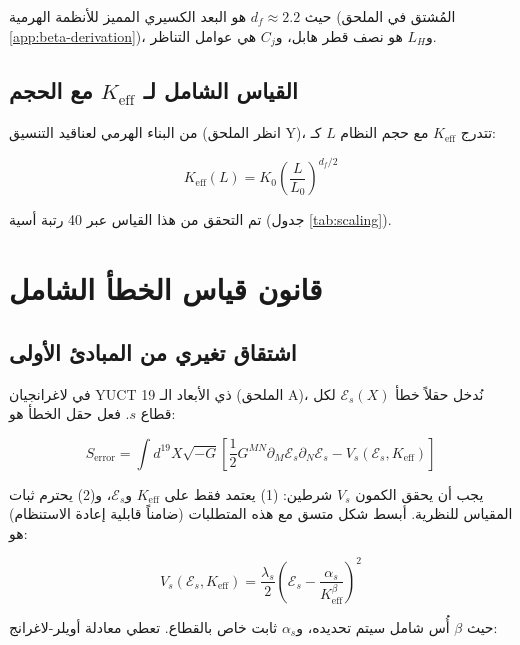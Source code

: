 \documentclass[11pt,a4paper]{article}
\newcommand{\Keff}{K_{\mathrm{eff}}}
\newcommand{\df}{d_{\!f}}
\begin{document}
	حيث \(\df \approx 2.2\) هو البعد الكسيري المميز للأنظمة الهرمية (المُشتق في الملحق \ref{app:beta-derivation})، و\(L_H\) هو نصف قطر هابل، و\(C_j\) هي عوامل التناظر.
	
	\subsection{القياس الشامل لـ \(\Keff\) مع الحجم}
	
	من البناء الهرمي لعناقيد التنسيق (انظر الملحق Y)، تتدرج \(\Keff\) مع حجم النظام \(L\) كـ:
	
	\begin{equation}
		\Keff(L) = K_0 \left(\frac{L}{L_0}\right)^{\df/2}
		\label{eq:keff-scaling}
	\end{equation}
	
	تم التحقق من هذا القياس عبر 40 رتبة أسية (جدول \ref{tab:scaling}).
	
	\section{قانون قياس الخطأ الشامل}
	\label{sec:error-law}
	
	\subsection{اشتقاق تغيري من المبادئ الأولى}
	
	في لاغرانجيان YUCT ذي الأبعاد الـ 19 (الملحق A)، نُدخل حقلاً خطأ \(\mathcal{E}_s(X)\) لكل قطاع \(s\). فعل حقل الخطأ هو:
	
	\begin{equation}
		S_{\text{error}} = \int d^{19}X \sqrt{-G} \left[ \frac{1}{2} G^{MN} \partial_M \mathcal{E}_s \partial_N \mathcal{E}_s - V_s(\mathcal{E}_s, \Keff) \right]
		\label{eq:error-action}
	\end{equation}
	
	يجب أن يحقق الكمون \(V_s\) شرطين: (1) يعتمد فقط على \(\Keff\) و\(\mathcal{E}_s\)، و(2) يحترم ثبات المقياس للنظرية. أبسط شكل متسق مع هذه المتطلبات (ضامناً قابلية إعادة الاستنظام) هو:
	
	\begin{equation}
		V_s(\mathcal{E}_s, \Keff) = \frac{\lambda_s}{2} \left( \mathcal{E}_s - \frac{\alpha_s}{\Keff^{\beta}} \right)^2
		\label{eq:error-potential}
	\end{equation}
	
	حيث \(\beta\) أُس شامل سيتم تحديده، و\(\alpha_s\) ثابت خاص بالقطاع. تعطي معادلة أويلر-لاغرانج:
	
\end{document}
